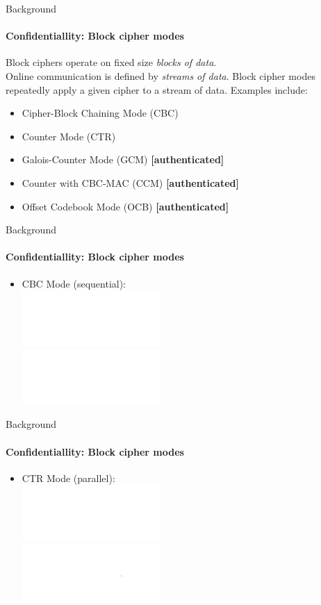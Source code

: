 \documentclass[hyperref={draft}]{beamer}
\begin{document}
\begin{frame}{Background}
  \framesubtitle{Confidentiallity: Block cipher modes}
  Block ciphers operate on fixed size \emph{blocks of data}.\\
  Online communication is defined by \emph{streams of data}.
  \newline
  \newline
  Block cipher modes repeatedly apply a given cipher to a stream of data.
  Examples include:
  \begin{itemize}
    \item Cipher-Block Chaining Mode (CBC)
    \item Counter Mode (CTR)
    \item Galois-Counter Mode (GCM) \textbf{[authenticated]}
    \item Counter with CBC-MAC (CCM) \textbf{[authenticated]}
    \item Offset Codebook Mode (OCB) \textbf{[authenticated]}
  \end{itemize}
\end{frame}

\begin{frame}{Background}
  \framesubtitle{Confidentiallity: Block cipher modes}
  \begin{itemize}
    \item CBC Mode (sequential):\\
    \includegraphics[height=80px]{CBC_encryption}\\
    \includegraphics[height=80px]{CBC_decryption}
  \end{itemize}
\end{frame}

\begin{frame}{Background}
  \framesubtitle{Confidentiallity: Block cipher modes}
  \begin{itemize}
    \item CTR Mode (parallel):\\
    \includegraphics[height=80px]{CTR_encryption}\\
    \includegraphics[height=80px]{CTR_decryption}
  \end{itemize}
\end{frame}
\end{document}
